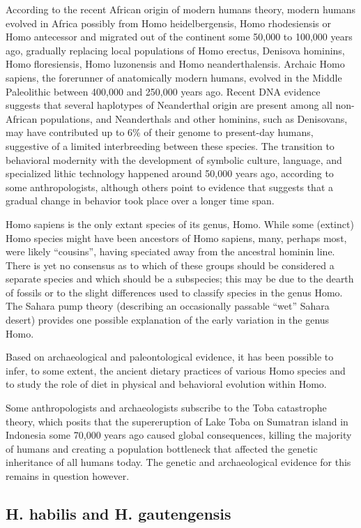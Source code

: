 According to the recent African origin of modern humans theory, modern humans evolved in Africa possibly from Homo heidelbergensis, Homo rhodesiensis or Homo antecessor and migrated out of the continent some 50,000 to 100,000 years ago, gradually replacing local populations of Homo erectus, Denisova hominins, Homo floresiensis, Homo luzonensis and Homo neanderthalensis. Archaic Homo sapiens, the forerunner of anatomically modern humans, evolved in the Middle Paleolithic between 400,000 and 250,000 years ago. Recent DNA evidence suggests that several haplotypes of Neanderthal origin are present among all non-African populations, and Neanderthals and other hominins, such as Denisovans, may have contributed up to 6\% of their genome to present-day humans, suggestive of a limited interbreeding between these species. The transition to behavioral modernity with the development of symbolic culture, language, and specialized lithic technology happened around 50,000 years ago, according to some anthropologists, although others point to evidence that suggests that a gradual change in behavior took place over a longer time span.

Homo sapiens is the only extant species of its genus, Homo. While some (extinct) Homo species might have been ancestors of Homo sapiens, many, perhaps most, were likely ``cousins'', having speciated away from the ancestral hominin line. There is yet no consensus as to which of these groups should be considered a separate species and which should be a subspecies; this may be due to the dearth of fossils or to the slight differences used to classify species in the genus Homo. The Sahara pump theory (describing an occasionally passable ``wet'' Sahara desert) provides one possible explanation of the early variation in the genus Homo.

Based on archaeological and paleontological evidence, it has been possible to infer, to some extent, the ancient dietary practices of various Homo species and to study the role of diet in physical and behavioral evolution within Homo.

Some anthropologists and archaeologists subscribe to the Toba catastrophe theory, which posits that the supereruption of Lake Toba on Sumatran island in Indonesia some 70,000 years ago caused global consequences, killing the majority of humans and creating a population bottleneck that affected the genetic inheritance of all humans today. The genetic and archaeological evidence for this remains in question however.

\hypertarget{h.-habilis-and-h.-gautengensis}{%
\subsection{H. habilis and H. gautengensis}\label{h.-habilis-and-h.-gautengensis}}

